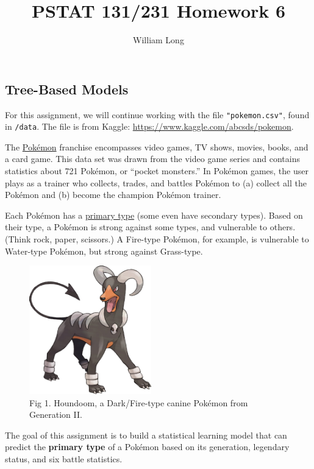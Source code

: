 \documentclass[
]{article}
\title{PSTAT 131/231 Homework 6}
\author{William Long}
\date{}
\begin{document}
\maketitle

{
\setcounter{tocdepth}{2}
\tableofcontents
}
\hypertarget{tree-based-models}{%
\subsection{Tree-Based Models}\label{tree-based-models}}

For this assignment, we will continue working with the file
\texttt{"pokemon.csv"}, found in \texttt{/data}. The file is from
Kaggle: \url{https://www.kaggle.com/abcsds/pokemon}.

The \href{https://www.pokemon.com/us/}{Pokémon} franchise encompasses
video games, TV shows, movies, books, and a card game. This data set was
drawn from the video game series and contains statistics about 721
Pokémon, or ``pocket monsters.'' In Pokémon games, the user plays as a
trainer who collects, trades, and battles Pokémon to (a) collect all the
Pokémon and (b) become the champion Pokémon trainer.

Each Pokémon has a
\href{https://bulbapedia.bulbagarden.net/wiki/Type}{primary type} (some
even have secondary types). Based on their type, a Pokémon is strong
against some types, and vulnerable to others. (Think rock, paper,
scissors.) A Fire-type Pokémon, for example, is vulnerable to Water-type
Pokémon, but strong against Grass-type.

\begin{figure}
\centering
\includegraphics[width=2.08333in,height=\textheight]{images/houndoom.jpg}
\caption{Fig 1. Houndoom, a Dark/Fire-type canine Pokémon from
Generation II.}
\end{figure}

The goal of this assignment is to build a statistical learning model
that can predict the \textbf{primary type} of a Pokémon based on its
generation, legendary status, and six battle statistics.
\end{document}
